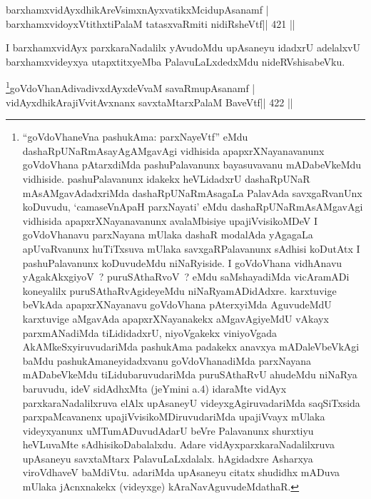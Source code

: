 
\begin{shl}
barxhamxvidAyxdhikAreV\s simxnAyxvatikxMcidupAsanamf |
barxhamxvidoyxVtithxtiPalaM tatasxvaRmiti nidiRsheVtf\hfill || 421 ||
\end{shl}

\begin{artha}
I barxhamxvidAyx parxkaraNadalilx yAvudoMdu upAsaneyu idadxrU adelalxvU barxhamxvideyxya utapxtitxyeMba PalavuLaLxdedxMdu nideRVshisabeVku.
\end{artha}



\begin{shl}
\footnote{``goVdoVhaneVna pashukAma: parxNayeVtf'' eMdu
  dashaRpUNaRmAsayAgAMgavAgi vidhisida apapxrXNayanavanunx
  goVdoVhana pAtarxdiMda pashuPalavanunx bayasuvavanu mADabeVkeMdu
  vidhiside. pashuPalavanunx idakekx heVLidadxrU dashaRpUNaR
  mAsAMgavAdadxriMda dashaRpUNaRmAsagaLa PalavAda savxgaRvanUnx
  koDuvudu, `camaseVnApaH parxNayati' eMdu dashaRpUNaRmAsAMgavAgi
  vidhisida apapxrXNayanavanunx avalaMbisiye upajiVvisikoMDeV I
  goVdoVhanavu parxNayana mUlaka dashaR modalAda yAgagaLa apUvaRvanunx
  huTiTxsuva mUlaka savxgaRPalavanunx sAdhisi koDutAtx I
  pashuPalavanunx koDuvudeMdu niNaRyiside. I goVdoVhana vidhAnavu
  yAgakAkxgiyoV~? puruSAthaRvoV~? eMdu saMshayadiMda vicAramADi
  koneyalilx puruSAthaRvAgideyeMdu niNaRyamADidAdxre. karxtuvige
  beVkAda apapxrXNayanavu goVdoVhana pAterxyiMda AguvudeMdU karxtuvige
  aMgavAda apapxrXNayanakekx aMgavAgiyeMdU vAkayx parxmANadiMda
  tiLididadxrU, niyoVgakekx viniyoVgada AkAMkeSxyiruvudariMda
  pashukAma padakekx anavxya mADaleVbeVkAgi baMdu
  pashukAmaneyidadxvanu goVdoVhanadiMda parxNayana mADabeVkeMdu
  tiLidubaruvudariMda puruSAthaRvU ahudeMdu niNaRya baruvudu,
  ideV sidAdhxMta (jeYmini a.4) idaraMte vidAyx parxkaraNadalilxruva
  elAlx upAsaneyU videyxgAgiruvadariMda saqSiTxsida parxpaMcavanenx
  upajiVvisikoMDiruvudariMda upajiVvayx mUlaka videyxyanunx
  uMTumADuvudAdarU beVre Palavanunx shurxtiyu heVLuvaMte
  sAdhisikoDabalalxdu. Adare vidAyxparxkaraNadalilxruva upAsaneyu
  savxtaMtarx PalavuLaLxdalalx. hAgidadxre Asharxya
  viroVdhaveV baMdiVtu. adariMda upAsaneyu citatx shudidhx
  mADuva mUlaka jAcnxnakekx (videyxge) kAraNavAguvudeMdathaR.}goVdoVhanAdivadivxdAyxdeVvaM savaRmupAsanamf |
vidAyxdhikArajiVvitAvxnanx savxtaMtarxPalaM BaveVtf\hfill || 422 ||
\end{shl}

